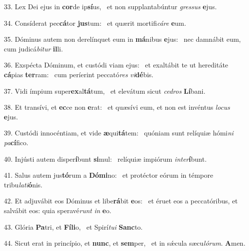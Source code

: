 33. Lex Dei ejus in \textbf{cor}de ip\textbf{sí}us, \ast\  et non supplantabúntur \textit{gres}\textit{sus} \textbf{e}jus.\

34. Consíderat pec\textbf{cá}tor \textbf{jus}tum: \ast\  et quærit mortifi\textit{cá}\textit{re} \textbf{e}um.\

35. Dóminus autem non derelínquet eum in \textbf{má}nibus \textbf{e}jus: \ast\  nec damnábit eum, cum judicá\textit{bi}\textit{tur} \textbf{il}li.\

36. Exspécta Dóminum, et custódi viam ejus: \dag\  et exaltábit te ut hereditáte \textbf{cá}pias \textbf{ter}ram: \ast\  cum períerint peccató\textit{res} \textit{vi}\textbf{dé}bis.\

37. Vidi ímpium super\textbf{ex}al\textbf{tá}tum, \ast\  et elevátum sicut \textit{ce}\textit{dros} \textbf{Lí}bani.\

38. Et transívi, et \textbf{ec}ce non \textbf{e}rat: \ast\  et quæsívi eum, et non est invéntus \textit{lo}\textit{cus} \textbf{e}jus.\

39. Custódi innocéntiam, et vide \textbf{æ}qui\textbf{tá}tem: \ast\  quóniam sunt relíquiæ hómi\textit{ni} \textit{pa}\textbf{cí}fico.\

40. Injústi autem disper\textbf{í}bunt \textbf{si}mul: \ast\  relíquiæ impiórum \textit{in}\textit{ter}\textbf{í}bunt.\

41. Salus autem jus\textbf{tó}rum a \textbf{Dó}\textbf{mi}no: \ast\  et protéctor eórum in témpore tribu\textit{la}\textit{ti}\textbf{ó}nis.\

42. Et adjuvábit eos Dóminus et libe\textbf{rá}bit \textbf{e}os: \ast\  et éruet eos a peccatóribus, et salvábit eos: quia speravé\textit{runt} \textit{in} \textbf{e}o.\

43. Glória \textbf{Pa}tri, et \textbf{Fí}\textbf{li}o, \ast\  et Spirí\textit{tu}\textit{i} \textbf{Sanc}to.\

44. Sicut erat in princípio, et \textbf{nunc}, et \textbf{sem}per, \ast\  et in sǽcula sæcu\textit{ló}\textit{rum}. \textbf{A}men.\

